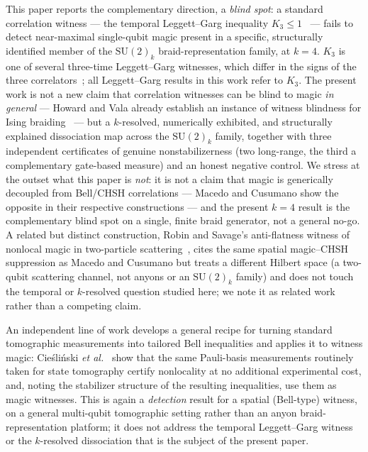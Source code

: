 \documentclass[aps,pra,twocolumn,superscriptaddress,longbibliography,floatfix,nofootinbib]{revtex4-2}
\begin{document}
This paper reports the complementary direction, a \emph{blind spot}:
a standard correlation witness --- the temporal Leggett--Garg
inequality $K_3\le1$~\cite{LeggettGarg1985,EmaryLambertNori2014,Budroni2014} --- fails to
detect near-maximal single-qubit magic present in a specific,
structurally identified member of the $\mathrm{SU}(2)_k$
braid-representation family, at $k=4$. $K_3$ is one of several
three-time Leggett--Garg witnesses, which differ in the signs of the
three correlators~\cite{EmaryLambertNori2014}; all Leggett--Garg results
in this work refer to $K_3$. The present work is not a new claim that
correlation witnesses can be blind to magic \emph{in general} ---
Howard and Vala already establish an instance of witness blindness for
Ising braiding~\cite{HowardVala2012} --- but a $k$-resolved,
numerically exhibited, and structurally explained dissociation map
across the $\mathrm{SU}(2)_k$ family, together with three independent
certificates of genuine nonstabilizerness (two long-range, the third
a complementary gate-based measure) and an honest negative
control. We stress at the outset what this paper is \emph{not}: it is
not a claim that magic is generically decoupled from Bell/CHSH
correlations --- Macedo and Cusumano show the opposite in their
respective constructions --- and the present $k=4$ result is the
complementary blind spot on a single, finite braid generator, not a
general no-go. A related but distinct construction, Robin and
Savage's anti-flatness witness of nonlocal magic in two-particle
scattering~\cite{RobinSavage2025}, cites the same spatial
magic--CHSH suppression as Macedo and Cusumano but treats a
different Hilbert space (a two-qubit scattering channel, not anyons
or an $\mathrm{SU}(2)_k$ family) and does not touch the temporal or
$k$-resolved question studied here; we note it as related work
rather than a competing claim.

An independent line of work develops a general recipe for turning
standard tomographic measurements into tailored Bell inequalities and
applies it to witness magic: Cie\'sli\'nski \emph{et
al.}~\cite{Cieslinski2026} show that the same Pauli-basis measurements
routinely taken for state tomography certify nonlocality at no
additional experimental cost, and, noting the stabilizer structure of
the resulting inequalities, use them as magic witnesses. This is again a
\emph{detection} result for a spatial (Bell-type) witness, on a
general multi-qubit tomographic setting rather than an anyon
braid-representation platform; it does not address the temporal
Leggett--Garg witness or the $k$-resolved dissociation that is the
subject of the present paper.
\end{document}
